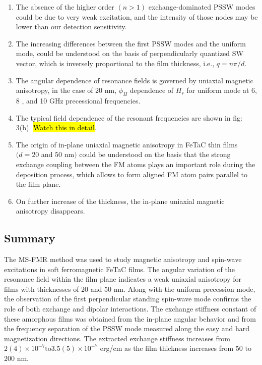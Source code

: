 \begin{enumerate}
    \item The absence of the higher order $(n>1)$ exchange-dominated PSSW modes could be due to very weak excitation, and the intensity of those nodes may be lower than our detection sensitivity.
    \item The increasing differences between the first PSSW modes and the uniform mode, could be understood on the basis of perpendicularly quantized SW vector, which is inversely proportional to the film thickness, i.e., $q=n\pi/d$.
    \item The angular dependence of resonance fields is governed by uniaxial magnetic anisotropy, in the case of 20 nm, $\phi_H$ dependence of $H_r$ for uniform mode at 6, 8 , and 10 GHz precessional frequencies.
    \item The typical field dependence of the resonant frequencies are shown in fig: 3(b). \hl{Watch this in detail}.
    \item The origin of in-plane uniaxial magnetic anisotropy in FeTaC thin films $(d=20$ and $50$ nm$)$ could be understood on the basis that the strong exchange coupling between the FM atoms plays an important role during the deposition process, which allows to form aligned FM atom pairs parallel to the film plane. 
    \item On further increase of the thickness, the in-plane uniaxial magnetic anisotropy disappears. 
\end{enumerate}
\subsection*{Summary}
The MS-FMR method was used to study magnetic anisotropy and spin-wave excitations in soft ferromagnetic FeTaC films. The angular variation of the resonance field within the film plane indicates a weak uniaxial anisotropy for films with thicknesses of 20 and 50 nm. Along with the uniform precession mode, the observation of the first perpendicular standing spin-wave mode confirms the role of both exchange and dipolar interactions. The exchange stiffness constant of these amorphous films was obtained from the in-plane angular behavior and from the frequency separation of the PSSW mode measured along the easy and hard magnetization directions. The extracted exchange stiffness increases from $2(4)\times10^{-7} \mathrm{to} 3.5(5)\times10^{-7}$ erg/cm as the film thickness increases from 50 to 200 nm.